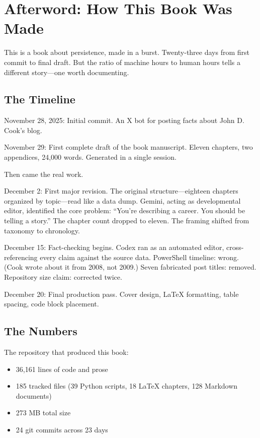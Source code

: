 \chapter*{Afterword: How This Book Was Made}

This is a book about persistence, made in a burst. Twenty-three days from first commit to final draft. But the ratio of machine hours to human hours tells a different story---one worth documenting.

\bigskip

\section*{The Timeline}

November 28, 2025: Initial commit. An X bot for posting facts about John D. Cook's blog.

November 29: First complete draft of the book manuscript. Eleven chapters, two appendices, 24,000 words. Generated in a single session.

Then came the real work.

December 2: First major revision. The original structure---eighteen chapters organized by topic---read like a data dump. Gemini, acting as developmental editor, identified the core problem: ``You're describing a career. You should be telling a story.'' The chapter count dropped to eleven. The framing shifted from taxonomy to chronology.

December 15: Fact-checking begins. Codex ran as an automated editor, cross-referencing every claim against the source data. PowerShell timeline: wrong. (Cook wrote about it from 2008, not 2009.) Seven fabricated post titles: removed. Repository size claim: corrected twice.

December 20: Final production pass. Cover design, LaTeX formatting, table spacing, code block placement.

\bigskip

\section*{The Numbers}

The repository that produced this book:

\begin{itemize}
\item 36,161 lines of code and prose
\item 185 tracked files (39 Python scripts, 18 LaTeX chapters, 128 Markdown documents)
\item 273 MB total size
\item 24 git commits across 23 days
\end{itemize}

